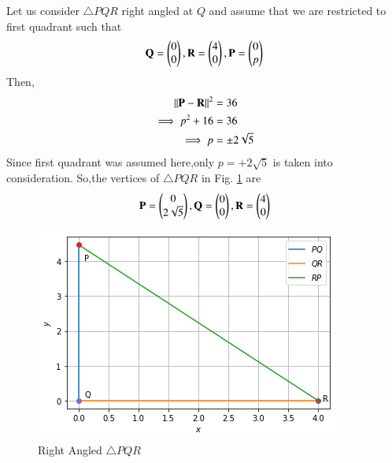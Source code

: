 Let us consider $\triangle PQR $ right angled at $Q$
and assume that we are restricted to first quadrant such that
\begin{align}
\mathbf{Q} = \begin{pmatrix}0\\0\end{pmatrix}, \mathbf{R} = \begin{pmatrix}4\\0\end{pmatrix}, \mathbf{P} = \begin{pmatrix}0\\p\end{pmatrix}
\end{align}
Then,
\begin{align}
\left\lVert\mathbf{P}-\mathbf{R}\right\rVert^2 &= 36
\\
\implies  p^2 + 16 &=36
 \\
\implies p &=\pm 2\sqrt{5}
\end{align}
Since first quadrant was assumed here,only $p=+2\sqrt{5}$ is taken into consideration.
So,the vertices of $\triangle PQR$ in Fig. \ref{constr/25/fig:right_angle_triangle} are
\begin{align}
\mathbf{P} = \begin{pmatrix}0\\2\sqrt{5}\end{pmatrix}, \mathbf{Q} = \begin{pmatrix}0\\0\end{pmatrix}, \mathbf{R} = \begin{pmatrix}4\\0\end{pmatrix}
\end{align}
%
\begin{figure}[!ht]
\centering
\includegraphics[width=\columnwidth]{solutions/25/Figures/figure1.png}
\caption{ Right Angled $\triangle PQR$}
\label{constr/25/fig:right_angle_triangle}	
\end{figure}
